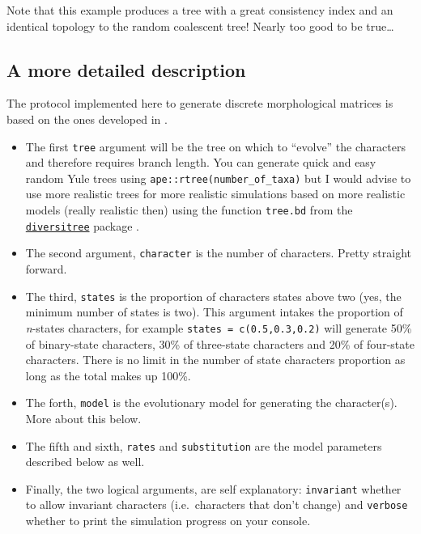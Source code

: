 \documentclass[]{book}
\providecommand{\tightlist}{%
  \setlength{\itemsep}{0pt}\setlength{\parskip}{0pt}}
\begin{document}
Note that this example produces a tree with a great consistency index and an identical topology to the random coalescent tree!
Nearly too good to be true\ldots{}

\hypertarget{a-more-detailed-description}{%
\subsection{A more detailed description}\label{a-more-detailed-description}}

The protocol implemented here to generate discrete morphological matrices is based on the ones developed in \citep{GuillermeCooper, OReilly2016, puttick2017uncertain, OReilly2017}.

\begin{itemize}
\tightlist
\item
  The first \texttt{tree} argument will be the tree on which to ``evolve'' the characters and therefore requires branch length.
  You can generate quick and easy random Yule trees using \texttt{ape::rtree(number\_of\_taxa)} but I would advise to use more realistic trees for more realistic simulations based on more realistic models (really realistic then) using the function \texttt{tree.bd} from the \href{http://www.zoology.ubc.ca/prog/diversitree/}{\texttt{diversitree}} package \citep{fitzjohndiversitree2012}.
\item
  The second argument, \texttt{character} is the number of characters. Pretty straight forward.
\item
  The third, \texttt{states} is the proportion of characters states above two (yes, the minimum number of states is two). This argument intakes the proportion of \emph{n}-states characters, for example \texttt{states\ =\ c(0.5,0.3,0.2)} will generate 50\% of binary-state characters, 30\% of three-state characters and 20\% of four-state characters. There is no limit in the number of state characters proportion as long as the total makes up 100\%.
\item
  The forth, \texttt{model} is the evolutionary model for generating the character(s). More about this below.
\item
  The fifth and sixth, \texttt{rates} and \texttt{substitution} are the model parameters described below as well.
\item
  Finally, the two logical arguments, are self explanatory: \texttt{invariant} whether to allow invariant characters (i.e.~characters that don't change) and \texttt{verbose} whether to print the simulation progress on your console.
\end{itemize}
\end{document}

